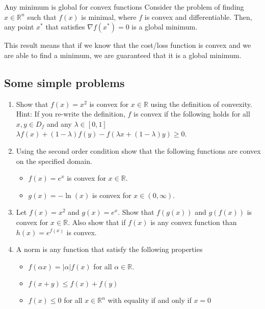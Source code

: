 \documentclass[%
oneside,                 %
final,                   %
10pt]{article}
\begin{document}
 Any minimum is global for convex functions
Consider the problem of finding $x \in \mathbb{R}^n$ such that $f(x)$
is minimal, where $f$ is convex and differentiable. Then, any point
$x^*$ that satisfies $\nabla f(x^*) = 0$ is a global minimum.

This result means that if we know that the cost/loss function is convex and we are able to find a minimum, we are guaranteed that it is a global minimum.

\subsection*{Some simple problems}

\begin{enumerate}
\item Show that $f(x)=x^2$ is convex for $x \in \mathbb{R}$ using the definition of convexity. Hint: If you re-write the definition, $f$ is convex if the following holds for all $x,y \in D_f$ and any $\lambda \in [0,1]$ $\lambda f(x)+(1-\lambda)f(y)-f(\lambda x + (1-\lambda) y ) \geq 0$.

\item Using the second order condition show that the following functions are convex on the specified domain.
\begin{itemize}

 \item $f(x) = e^x$ is convex for $x \in \mathbb{R}$.

 \item $g(x) = -\ln(x)$ is convex for $x \in (0,\infty)$.

\end{itemize}

\noindent
\item Let $f(x) = x^2$ and $g(x) = e^x$. Show that $f(g(x))$ and $g(f(x))$ is convex for $x \in \mathbb{R}$. Also show that if $f(x)$ is any convex function than $h(x) = e^{f(x)}$ is convex.

\item A norm is any function that satisfy the following properties
\begin{itemize}

 \item $f(\alpha x) = |\alpha| f(x)$ for all $\alpha \in \mathbb{R}$.

 \item $f(x+y) \leq f(x) + f(y)$

 \item $f(x) \leq 0$ for all $x \in \mathbb{R}^n$ with equality if and only if $x = 0$
\end{itemize}

\noindent
\end{enumerate}
\end{document}
